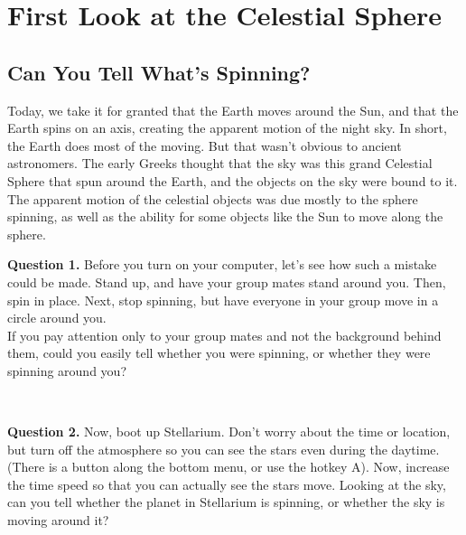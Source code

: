 \documentclass[11pt]{article}
\begin{document}
	\newpage
	
	\section{First Look at the Celestial Sphere}
	
	\subsection{Can You Tell What's Spinning?}
	
	Today, we take it for granted that the Earth moves around the Sun, and that the Earth spins on an axis, creating the apparent motion of the night sky. In short, the Earth does most of the moving. But that wasn't obvious to ancient astronomers. The early Greeks thought that the sky was this grand Celestial Sphere that spun around the Earth, and the objects on the sky were bound to it. The apparent motion of the celestial objects was due mostly to the sphere spinning, as well as the ability for some objects like the Sun to move along the sphere.
	
	\noindent
	\textbf{Question 1.} Before you turn on your computer, let's see how such a mistake could be made. Stand up, and have your group mates stand around you. Then, spin in place. Next, stop spinning, but have everyone in your group move in a circle around you.\\
	
	If you pay attention only to your group mates and not the background behind them, could you easily tell whether you were spinning, or whether they were spinning around you?\\
	\vspace*{1.5cm}
	
	\hrulefill\\
	\noindent
	
	\textbf{Question 2.} Now, boot up Stellarium. Don't worry about the time or location, but turn off the atmosphere so you can 
	see the stars even during the daytime.
	(There is a button along the bottom menu, or use the hotkey A). Now, increase the time speed so that you can actually see the stars move. Looking at the sky, can you tell whether the planet in Stellarium is spinning, or whether the sky is moving around it?\\
	\vspace*{1.5cm}
	
	
	\hrulefill\\
	
	\newpage
	
\end{document}
